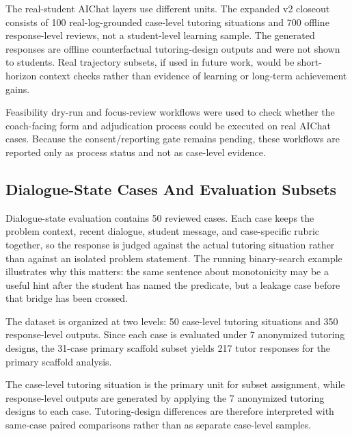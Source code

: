 \documentclass[11pt]{article}
\begin{document}
The real-student AIChat layers use different units. The expanded v2 closeout consists of 100 real-log-grounded case-level tutoring situations and 700 offline response-level reviews, not a student-level learning sample. The generated responses are offline counterfactual tutoring-design outputs and were not shown to students. Real trajectory subsets, if used in future work, would be short-horizon context checks rather than evidence of learning or long-term achievement gains.

Feasibility dry-run and focus-review workflows were used to check whether the coach-facing form and adjudication process could be executed on real AIChat cases. Because the consent/reporting gate remains pending, these workflows are reported only as process status and not as case-level evidence.

\subsection{Dialogue-State Cases And Evaluation Subsets}

Dialogue-state evaluation contains 50 reviewed cases. Each case keeps the problem context, recent dialogue, student message, and case-specific rubric together, so the response is judged against the actual tutoring situation rather than against an isolated problem statement. The running binary-search example illustrates why this matters: the same sentence about monotonicity may be a useful hint after the student has named the predicate, but a leakage case before that bridge has been crossed.

The dataset is organized at two levels: 50 case-level tutoring situations and 350 response-level outputs. Since each case is evaluated under 7 anonymized tutoring designs, the 31-case primary scaffold subset yields 217 tutor responses for the primary scaffold analysis.

The case-level tutoring situation is the primary unit for subset assignment, while response-level outputs are generated by applying the 7 anonymized tutoring designs to each case. Tutoring-design differences are therefore interpreted with same-case paired comparisons rather than as separate case-level samples.
\end{document}
